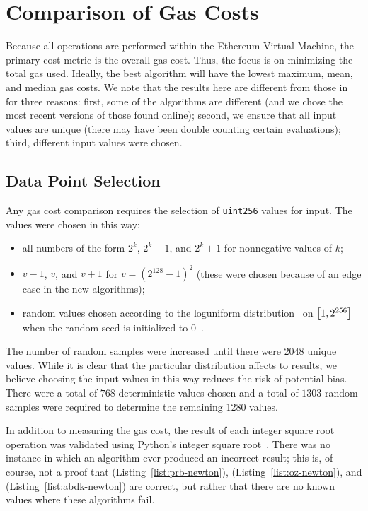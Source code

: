 \section{Comparison of Gas Costs}
\label{sec:comparison}

Because all operations are performed within the Ethereum Virtual Machine,
the primary cost metric is the overall gas cost.
Thus, the focus is on minimizing the total gas used.
Ideally, the best algorithm will have the lowest maximum, mean, and median
gas costs.
We note that the results here are different from those
in~\cite{EfficientIsqrt} for three reasons:
first, some of the algorithms are different
(and we chose the most recent versions of those found online);
second, we ensure that all input values are unique
(there may have been double counting certain evaluations);
third, different input values were chosen.

\subsection{Data Point Selection}

Any gas cost comparison requires the selection of \texttt{uint256}
values for input.
The values were chosen in this way:

\begin{itemize}
\item all numbers of the form $2^{k}$, $2^{k}-1$, and $2^{k}+1$
    for nonnegative values of $k$;
\item $v-1$, $v$, and $v+1$ for $v = (2^{128}-1)^{2}$
    (these were chosen because of an edge case in the new algorithms);
\item random values chosen according to the
    loguniform distribution~\cite{ScipyLoguniform}
    on $\left[ 1, 2^{256} \right]$ when the random seed
    is initialized to $0$~\cite{NumpyRandomSeed}.
\end{itemize}

\noindent
The number of random samples were increased until
there were $2048$ unique values.
While it is clear that the particular distribution affects to results,
we believe choosing the input values in this way reduces
the risk of potential bias.
There were a total of $768$ deterministic values chosen
and a total of $1303$ random samples were required to determine
the remaining 1280 values.

In addition to measuring the gas cost,
the result of each integer square root operation was
validated using
Python's integer square root~\cite{PythonIsqrt,PythonIsqrtLink}.
There was no instance in which an algorithm ever produced an incorrect result;
this is, of course, not a proof that 
\prb{} (Listing~\ref{list:prb-newton}),
\OpenZeppelin{} (Listing~\ref{list:oz-newton}), and
\abdk{} (Listing~\ref{list:abdk-newton})
are correct,
but rather that there are no known values where these algorithms fail.

